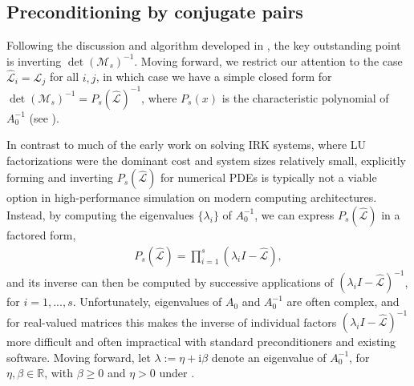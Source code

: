 \documentclass[a4paper,10pt]{article}
\begin{document}
\subsection{Preconditioning by conjugate pairs}\label{sec:solve:prec}

Following the discussion and algorithm developed in , the key
outstanding point is inverting $\det(\mathcal{M}_s)^{-1}$. Moving forward, we
restrict our attention to the case $\widehat{\mathcal{L}}_i = \widehat{\mathcal{L}}_j$ for all $i,j$,
in which case we have a simple closed form for $\det(\mathcal{M}_s)^{-1} =
P_s(\widehat{\mathcal{L}})^{-1}$, where $P_s(x)$ is the characteristic polynomial
of $A_0^{-1}$ (see ).

In contrast to much of the early work on solving IRK systems, where LU factorizations
were the dominant cost and system sizes relatively small, explicitly forming and inverting
$P_s(\widehat{\mathcal{L}})$ for numerical PDEs is typically not a viable option in high-performance
simulation on modern computing architectures. Instead, by computing the eigenvalues
$\{\lambda_i\}$ of $A_0^{-1}$, we can express $P_s(\widehat{\mathcal{L}})$ in a factored form,
%
\begin{align}\label{eq:fac}
P_s(\widehat{\mathcal{L}}) = \prod_{i=1}^s (\lambda_i I - \widehat{\mathcal{L}}),
\end{align}
%
and its inverse can then be computed by successive applications of
$(\lambda_iI - \widehat{\mathcal{L}})^{-1}$,
for $i=1,...,s$. Unfortunately, eigenvalues of $A_0$ and $A_0^{-1}$ are often
complex, and for real-valued matrices this makes the inverse of individual factors
$(\lambda_iI - \widehat{\mathcal{L}})^{-1}$ more difficult and often impractical
with standard preconditioners and existing software. Moving forward, let
$\lambda := \eta + \mathrm{i}\beta$ denote an eigenvalue of $A_0^{-1}$,
for $\eta, \beta \in \mathbb{R}$, with $\beta \geq 0$ and $\eta > 0$ under .
\end{document}
